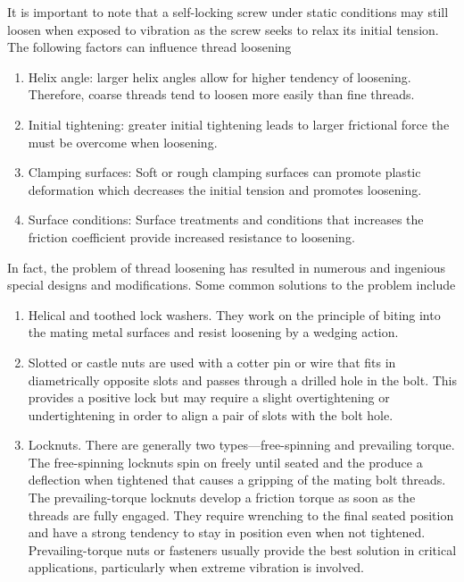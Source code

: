 \documentclass[a4paper,openany,12pt]{book}
\begin{document}
{{It is important to note that a self-locking screw under static
conditions may still loosen when exposed to vibration as the screw seeks
to relax its initial tension. The following factors can influence thread
loosening

\begin{enumerate}
\item Helix angle: larger helix angles allow for higher tendency of
loosening. Therefore, coarse threads tend to loosen more easily than
fine threads.

\item Initial tightening: greater initial tightening leads to larger
frictional force the must be overcome when loosening.

\item Clamping surfaces: Soft or rough clamping surfaces can promote
plastic deformation which decreases the initial tension and promotes
loosening.

\item Surface conditions: Surface treatments and conditions that increases
the friction coefficient provide increased resistance to loosening.
\end{enumerate}

In fact, the problem of thread loosening has resulted in numerous and
ingenious special designs and modifications. Some common solutions to
the problem include

\begin{enumerate}
\item Helical and toothed lock washers. They work on the principle of
biting into the mating metal surfaces and resist loosening by a
wedging action.

\item Slotted or castle nuts are used with a cotter pin or wire that fits
in diametrically opposite slots and passes through a drilled hole in
the bolt. This provides a positive lock but may require a slight
overtightening or undertightening in order to align a pair of slots
with the bolt hole.

\item Locknuts. There are generally two types---free-spinning and
prevailing torque. The free-spinning locknuts spin on freely until
seated and the produce a deflection when tightened that causes a
gripping of the mating bolt threads. The prevailing-torque locknuts
develop a friction torque as soon as the threads are fully engaged.
They require wrenching to the final seated position and have a strong
tendency to stay in position even when not tightened.
Prevailing-torque nuts or fasteners usually provide the best solution
in critical applications, particularly when extreme vibration is
involved.


\end{enumerate}}}
\end{document}
